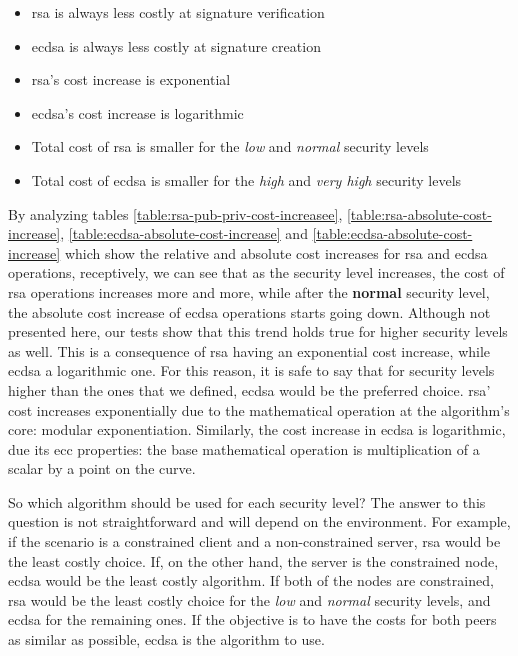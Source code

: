 \documentclass{llncs}
\begin{document}
\begin{itemize}
  \item \gls{rsa} is always less costly at signature verification
  \item \gls{ecdsa} is always less costly at signature creation
  \item \gls{rsa}'s cost increase is exponential
  \item \gls{ecdsa}'s cost increase is logarithmic
  \item Total cost of \gls{rsa} is smaller for the \textit{low} and \textit{normal} security levels
  \item Total cost of \gls{ecdsa} is smaller for the \textit{high} and \textit{very high} security levels
\end{itemize}

By analyzing tables \ref{table:rsa-pub-priv-cost-increasee}, \ref{table:rsa-absolute-cost-increase}, \ref{table:ecdsa-absolute-cost-increase} and
\ref{table:ecdsa-absolute-cost-increase} which show the relative and absolute cost increases for \gls{rsa} and \gls{ecdsa} operations, receptively,
we can see that as the security level increases, the cost of \gls{rsa} operations increases more and more, while after the \textbf{normal} security
level, the absolute cost increase of \gls{ecdsa} operations starts going down. Although not presented here, our tests show that this trend holds true
for higher security levels as well. This is a consequence of \gls{rsa} having an exponential cost increase, while \gls{ecdsa} a logarithmic one.
For this reason, it is safe to say that for security levels higher than the ones that we defined, \gls{ecdsa} would be the preferred choice.
\gls{rsa}' cost increases exponentially due to the mathematical operation at the algorithm's core: modular exponentiation. Similarly, the cost
increase in \gls{ecdsa} is logarithmic, due its \gls{ecc} properties: the base mathematical operation is multiplication of a scalar by a point on the
curve.

So which algorithm should be used for each security level? The answer to this question is not straightforward and will depend on the environment.
For example, if the scenario is a constrained client and a non-constrained server, \gls{rsa} would be the least costly choice. If, on the
other hand, the server is the constrained node, \gls{ecdsa} would be the least costly algorithm. If both of the nodes are
constrained, \gls{rsa} would be the least costly choice for the \textit{low} and \textit{normal} security levels, and \gls{ecdsa} for the remaining ones.
If the objective is  to have the costs for both peers as similar as possible, \gls{ecdsa} is the algorithm to use.
\end{document}
